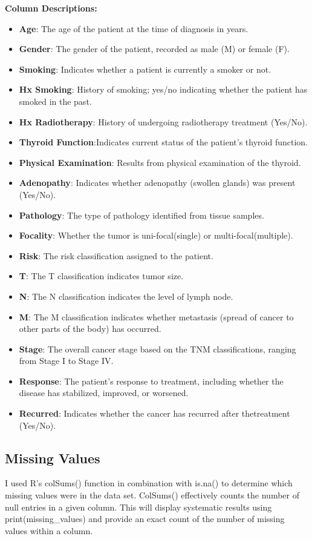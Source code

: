 \documentclass[12pt]{article}
\begin{document}
\textbf{Column Descriptions:}

\begin{itemize}
\item \textbf{Age}: The age of the patient at the time of diagnosis in years.
    \item \textbf{Gender}: The gender of the patient, recorded as male (M) or female (F).
    \item \textbf{Smoking}: Indicates whether a patient is currently a smoker or not.
    \item \textbf{Hx Smoking}: History of smoking; yes/no indicating whether the patient has smoked in the past.
    \item \textbf{Hx Radiotherapy}: History of undergoing radiotherapy treatment (Yes/No).
    \item \textbf{Thyroid Function}:Indicates current status of the patient's thyroid function.
    \item \textbf{Physical Examination}: Results from physical examination of the thyroid.
    \item \textbf{Adenopathy}: Indicates whether adenopathy (swollen glands) was present (Yes/No).
    \item \textbf{Pathology}: The type of pathology identified from tissue samples. 
    \item \textbf{Focality}: Whether the tumor is uni-focal(single) or multi-focal(multiple).
    \item \textbf{Risk}: The risk classification assigned to the patient.
    \item \textbf{T}: The T classification indicates tumor size.
    \item \textbf{N}: The N classification indicates the level of lymph node.
    \item \textbf{M}: The M classification indicates whether metastasis (spread of cancer to other parts of the body) has occurred.
    \item \textbf{Stage}: The overall cancer stage based on the TNM classifications, ranging from Stage I to Stage IV.
    \item \textbf{Response}: The patient's response to treatment, including whether the disease has stabilized, improved, or worsened.
    \item \textbf{Recurred}: Indicates whether the cancer has recurred after thetreatment (Yes/No).
\end{itemize}



\subsection{Missing Values}
I used R's colSums() function in combination with is.na() to determine which missing values were in the data set. ColSums() effectively counts the number of null entries in a given column. This will display systematic results using print(missing\_values) and provide an exact count of the number of missing values within a column.
\end{document}
